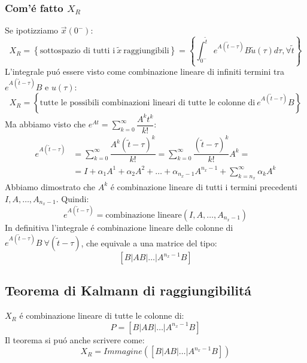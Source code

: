 \documentclass[../main.tex]{subfiles}
\begin{document}
	\subsubsection{Com'\'e fatto $ X_R $}
		Se ipotizziamo $ \vec x(0^-) $:
		\[
			X_R = \left\lbrace \text{sottospazio di tutti i}\ \tilde x\ \text{raggiungibili} \right\rbrace = \left\lbrace \int_{0^-}^{\tilde t} e^{A(\tilde t - \tau)} B \tilde u(\tau) d\tau, \forall \tilde t \right\rbrace
		\]
		L'integrale pu\'o essere visto come combinazione lineare di infiniti termini tra $ e^{A(\tilde t - \tau)} B $ e $ u(\tau) $:
		\[
			X_R = \left\lbrace \text{tutte le possibili combinazioni lineari di tutte le colonne di}\ e^{A(\tilde t - \tau)} B \right\rbrace
		\]
		Ma abbiamo visto che $ e^{At} = \sum_{k=0}^{\infty} \dfrac{A^k t^k}{k!} $:
		\begin{align*}
			e^{A(\tilde t - \tau)} &= \sum_{k=0}^{\infty} \dfrac{A^k (\tilde t - \tau)^k}{k!} = \sum_{k=0}^{\infty} \dfrac{(\tilde t - \tau)^k}{k!} A^k =
			\\
			&= I + \alpha_1 A^1 + \alpha_2 A^2 + \dots + \alpha_{n_x-1} A^{n_x-1} + \sum_{k=n_x}^{\infty} \alpha_k A^k
		\end{align*}		
		Abbiamo dimostrato che $ A^k $ \'e combinazione lineare di tutti i termini precedenti $ I, A, \dots, A_{n_x-1} $. Quindi:
		\[
			e^{A(\tilde t - \tau)} = \text{combinazione lineare}(I, A, \dots, A_{n_x-1})
		\]
		In definitiva l'integrale \'e combinazione lineare delle colonne di $ e^{A(\tilde t - \tau)} B\ \forall (\tilde t - \tau) $, che equivale a una matrice del tipo:
		\[
			\left[ B | AB | \dots | A^{n_x-1} B \right]
		\]

	\subsection{Teorema di Kalmann di raggiungibilit\'a}
		$ X_R $ \'e combinazione lineare di tutte le colonne di:
		\[
			P = \left[ B | AB | \dots | A^{n_x-1} B \right]
		\]
		Il teorema si pu\'o anche scrivere come:
		\[ 
			X_R = Immagine\left( \left[ B | AB | \dots | A^{n_x-1} B \right] \right)
		\]
		
\end{document}
